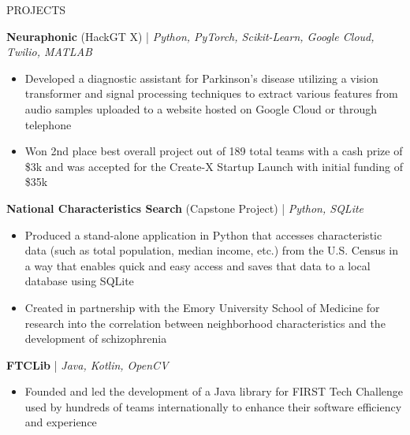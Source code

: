 \documentclass{resume} %
\begin{document}

\vspace{-0.8em}
\begin{rSection}{PROJECTS}
\vspace{-1.25em}
\item \textbf{Neuraphonic} (HackGT X) | \textit{Python, PyTorch, Scikit-Learn, Google Cloud, Twilio, MATLAB}
\vspace{-0.5em}
\begin{itemize}
   \itemsep -5pt {}
   \item Developed a diagnostic assistant for Parkinson's disease utilizing a vision transformer and signal processing techniques to extract
   various features from audio samples uploaded to a website hosted on Google Cloud or through telephone
   \item Won 2nd place best overall project out of 189 total teams with a cash prize of \$3k and was accepted for
   the Create-X Startup Launch with initial funding of \$35k
\end{itemize}
\vspace{-0.5em}
\item \textbf{National Characteristics Search} (Capstone Project) | \textit{Python, SQLite}
\vspace{-0.5em}
\begin{itemize}
   \itemsep -5pt {}
   \item Produced a stand-alone application in Python that accesses characteristic data (such as total population, median income, etc.)
   from the U.S. Census in a way that enables quick and easy access and saves that data to a local database using SQLite
   \item Created in partnership with the Emory University School of Medicine for research into the correlation between
   neighborhood characteristics and the development of schizophrenia
\end{itemize}
\vspace{-0.5em}
\item \textbf{FTCLib} | \textit{Java, Kotlin, OpenCV}
\vspace{-0.5em}
\begin{itemize}
   \itemsep -5pt {}
   \item Founded and led the development of a Java library for FIRST Tech Challenge used by hundreds of teams internationally
   to enhance their software efficiency and experience
\end{itemize}
\end{rSection}
\end{document}
